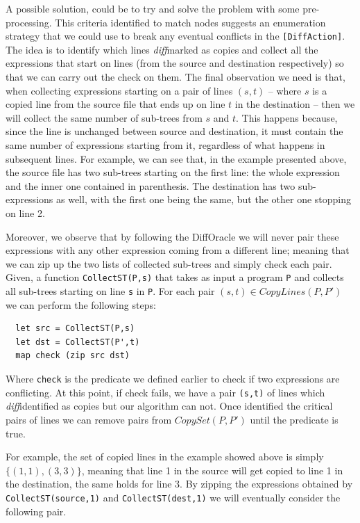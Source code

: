 \documentclass[11pt, titlepage]{article}
\newcommand{\toHaskell}[1]{\texttt{#1}\xspace}
\newcommand{\diff}{\emph{diff}}
\begin{document}
A possible solution, could be to try and solve the problem with some pre-processing.
This criteria identified to match nodes suggests an enumeration strategy that we could use to break any eventual conflicts in the \texttt{[DiffAction]}. 
The idea is to identify which lines \diff marked as copies and collect all the expressions that start on lines (from the source and destination respectively) so that we can carry out the check on them.
The final observation we need is that, when collecting expressions starting on a pair of lines $(s,t)$ -- where $s$ is a copied line from the source file that ends up on line $t$ in the destination -- then we will collect the same number of sub-trees from $s$ and $t$. 
This happens because, since the line is unchanged between source and destination, it must contain the same number of expressions starting from it, regardless of what happens in subsequent lines. For example, we can see that, in the example presented above, the source file has two sub-trees starting on the first line: the whole expression and the inner one contained in parenthesis. The destination has two sub-expressions as well, with the first one being the same, but the other one stopping on line 2.

Moreover, we observe that by following the DiffOracle we will never pair these expressions with any other expression coming from a different line; meaning that we can zip up the two lists of collected sub-trees and simply check each pair.
Given, a function \toHaskell{CollectST(P,s)} that takes as input a program \toHaskell{P} and collects all sub-trees starting on line \toHaskell{s} in \toHaskell{P}. 
For each pair $(s,t) \in CopyLines(P,P')$ we can perform the following steps:

\begin{verbatim}
  let src = CollectST(P,s)
  let dst = CollectST(P',t)
  map check (zip src dst) 
\end{verbatim}

Where \texttt{check} is the predicate we defined earlier to check if two expressions are conflicting.
At this point, if check fails, we have a pair \texttt{(s,t)} of lines which \diff identified as copies but our algorithm can not. 
Once identified the critical pairs of lines we can remove pairs from $CopySet(P,P')$ until the predicate is true. 

For example, the set of copied lines in the example showed above is simply $\{(1,1), (3,3)\}$, meaning that line 1 in the source will get copied to line 1 in the destination, the same holds for line 3. 
By zipping the expressions obtained by \toHaskell{CollectST(source,1)} and \toHaskell{CollectST(dest,1)} we will eventually consider the following pair.
\end{document}
